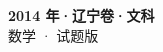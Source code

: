\documentclass[zihao=-4, a4paper]{ctexart}
\begin{document}
\begin{center}
  {\Large\bfseries 2014 年·辽宁卷·文科}\\[4pt]
  {\large 数学 · 试题版}
\end{center}
\medskip
{}

\end{document}
